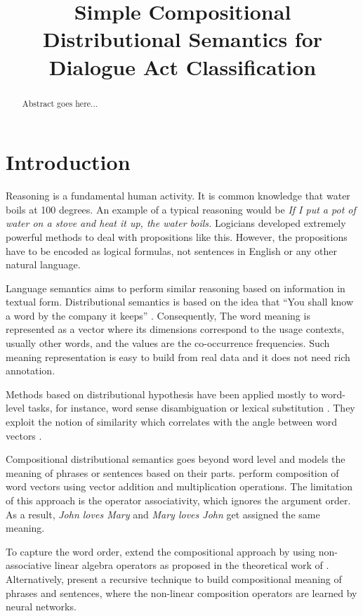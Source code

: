 \documentclass[11pt]{article}
\title{Simple Compositional Distributional Semantics for Dialogue Act
  Classification}
\begin{document}
\maketitle

\begin{abstract}
  Abstract goes here...
\end{abstract}

\section{Introduction}

Reasoning is a fundamental human activity. It is common knowledge that water
boils at 100 degrees. An example of a typical reasoning would be \textit{If I
  put a pot of water on a stove and heat it up, the water boils.} Logicians
developed extremely powerful methods to deal with propositions like
this. However, the propositions have to be encoded as logical formulas, not
sentences in English or any other natural language.

Language semantics aims to perform similar reasoning based on information in
textual form. Distributional semantics is based on the idea that ``You shall
know a word by the company it keeps'' \cite{firth1957lingtheory}. Consequently,
The word meaning is represented as a vector where its dimensions correspond to
the usage contexts, usually other words, and the values are the co-occurrence
frequencies.  Such meaning representation is easy to build from real data and it
does not need rich annotation.

Methods based on distributional hypothesis have been applied mostly to
word-level tasks, for instance, word sense disambiguation
\cite{zhitomirsky2009bootstrapping} or lexical substitution
\cite{thater2010}. They exploit the notion of similarity which correlates with
the angle between word vectors \cite{turney2010frequency}.

Compositional distributional semantics goes beyond word level and models the
meaning of phrases or sentences based on their parts. \cite{mitchell2008vector}
perform composition of word vectors using vector addition and multiplication
operations. The limitation of this approach is the operator associativity, which
ignores the argument order. As a result, \textit{John loves Mary} and
\textit{Mary loves John} get assigned the same meaning.

To capture the word order, \cite{grefenstette2011experimental} extend the
compositional approach by using non-associative linear algebra operators as
proposed in the theoretical work of \cite{coecke2010}. Alternatively,
\cite{socher2012semantic} present a recursive technique to build compositional
meaning of phrases and sentences, where the non-linear composition operators are
learned by neural networks.
\end{document}
